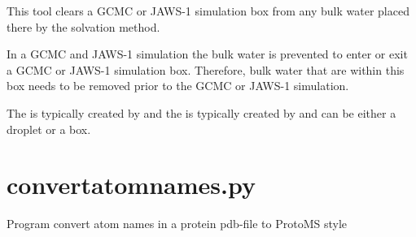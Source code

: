 \documentclass[letterpaper,10pt,english]{sphinxmanual}
\begin{document}

%
\begin{sphinxVerbatim}[commandchars=\\\{\}]
    
      
\end{sphinxVerbatim}


This tool clears a GCMC or JAWS-1 simulation box from any bulk water placed there by the solvation method.

In a GCMC and JAWS-1 simulation the bulk water is prevented to enter or exit a GCMC or JAWS-1 simulation box. Therefore, bulk water that are within this box needs to be removed prior to the GCMC or JAWS-1 simulation.

The  is typically created by  and the  is typically created by  and can be either a droplet or a box.


\section{convertatomnames.py}
\label{\detokenize{tools:convertatomnames-py}}

Program convert atom names in a protein pdb-file to ProtoMS style


%
\begin{sphinxVerbatim}[commandchars=\\\{\}]
  \PYG{p}{[}\PYG{p}{]} \PYG{p}{[} \PYG{p}{]} \PYG{p}{[} \PYG{p}{]} \PYG{p}{[} \PYG{p}{]}
                           \PYG{p}{[} \PYG{p}{]}
\end{sphinxVerbatim}
\end{document}
